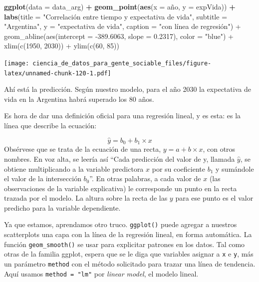 \documentclass[spanish,]{book}
\newenvironment{Shaded}{\begin{snugshade}}{\end{snugshade}}
\newcommand{\DataTypeTok}[1]{\textcolor[rgb]{0.13,0.29,0.53}{#1}}
\newcommand{\KeywordTok}[1]{\textcolor[rgb]{0.13,0.29,0.53}{\textbf{#1}}}
\newcommand{\NormalTok}[1]{#1}
\newcommand{\OperatorTok}[1]{\textcolor[rgb]{0.81,0.36,0.00}{\textbf{#1}}}
\newcommand{\StringTok}[1]{\textcolor[rgb]{0.31,0.60,0.02}{#1}}
\begin{document}
\begin{Shaded}
\begin{Highlighting}[]
\KeywordTok{ggplot}\NormalTok{(}\DataTypeTok{data =}\NormalTok{ data_arg) }\OperatorTok{+}\StringTok{ }
\StringTok{    }\KeywordTok{geom_point}\NormalTok{(}\KeywordTok{aes}\NormalTok{(}\DataTypeTok{x =}\NormalTok{ año, }\DataTypeTok{y =}\NormalTok{ expVida)) }\OperatorTok{+}
\StringTok{    }\KeywordTok{labs}\NormalTok{(}\DataTypeTok{title =} \StringTok{"Correlación entre tiempo y expectativa de vida"}\NormalTok{,}
         \DataTypeTok{subtitle =} \StringTok{"Argentina"}\NormalTok{,}
         \DataTypeTok{y =} \StringTok{"expectativa de vida"}\NormalTok{,}
         \DataTypeTok{caption =} \StringTok{"con línea de regresión") +}
\StringTok{    geom_abline(aes(intercept = -389.6063, slope = 0.2317), color = "}\NormalTok{blue}\StringTok{") +}
\StringTok{    xlim(c(1950, 2030)) +}
\StringTok{    ylim(c(60, 85))}
\end{Highlighting}
\end{Shaded}

\texttt{[image: ciencia\_de\_datos\_para\_gente\_sociable\_files/figure-latex/unnamed-chunk-120-1.pdf]}

Ahí está la predicción. Según nuestro modelo, para el año 2030 la expectativa de vida en la Argentina habrá superado los 80 años.

Es hora de dar una definición oficial para una regresión lineal, y es esta: es la línea que describe la ecuación:

\[ \hat{y} = b_0 + b_1 \times x \]
Obsérvese que se trata de la ecuación de una recta, \(y = a + b \times x\), con otros nombres. En voz alta, se leería así ``Cada predicción del valor de y, llamada \(\hat{y}\), se obtiene multiplicando a la variable predictora \(x\) por su coeficiente \(b_1\) y sumándole el valor de la intersección \(b_0\)''. En otras palabras, a cada valor de \(x\) (las observaciones de la variable explicativa) le corresponde un punto en la recta trazada por el modelo. La altura sobre la recta de las \(y\) para ese punto es el valor predicho para la variable dependiente.

Ya que estamos, aprendamos otro truco. \texttt{ggplot()} puede agregar a nuestros scatterplots una capa con la línea de la regresión lineal, en forma automática. La función \texttt{geom\_smooth()} se usar para explicitar patrones en los datos. Tal como otras de la familia ggplot, espera que se le diga que variables asignar a \texttt{x} e \texttt{y}, más un parámetro \texttt{method} con el método solicitado para trazar una línea de tendencia. Aquí usamos \texttt{method\ =\ "lm"} por \emph{linear model}, el modelo lineal.
\end{document}
